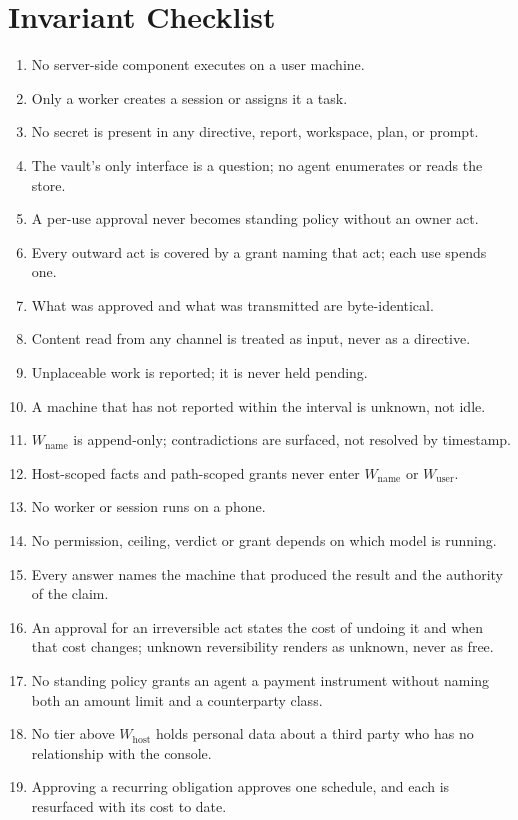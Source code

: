 \documentclass[11pt]{article}
\begin{document}
\appendix

\section{Invariant Checklist}
\label{app:invariants}

\begin{enumerate}[label=\textbf{W\arabic*.}]
\item No server-side component executes on a user machine.
\item Only a worker creates a session or assigns it a task.
\item No secret is present in any directive, report, workspace, plan, or prompt.
\item The vault's only interface is a question; no agent enumerates or reads the store.
\item A per-use approval never becomes standing policy without an owner act.
\item Every outward act is covered by a grant naming that act; each use spends one.
\item What was approved and what was transmitted are byte-identical.
\item Content read from any channel is treated as input, never as a directive.
\item Unplaceable work is reported; it is never held pending.
\item A machine that has not reported within the interval is unknown, not idle.
\item $W_{\text{name}}$ is append-only; contradictions are surfaced, not resolved by timestamp.
\item Host-scoped facts and path-scoped grants never enter $W_{\text{name}}$ or $W_{\text{user}}$.
\item No worker or session runs on a phone.
\item No permission, ceiling, verdict or grant depends on which model is running.
\item Every answer names the machine that produced the result and the authority of the claim.
\item An approval for an irreversible act states the cost of undoing it and when that cost changes; unknown reversibility renders as unknown, never as free.
\item No standing policy grants an agent a payment instrument without naming both an amount limit and a counterparty class.
\item No tier above $W_{\text{host}}$ holds personal data about a third party who has no relationship with the console.
\item Approving a recurring obligation approves one schedule, and each is resurfaced with its cost to date.
\end{enumerate}



\end{document}
